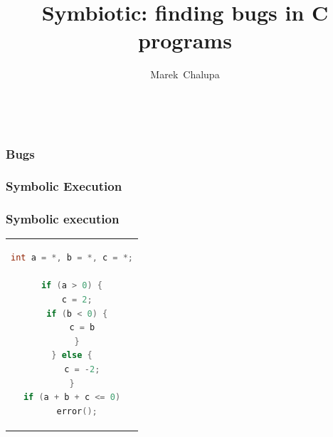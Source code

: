 \documentclass[sans]{beamer}
\title{\fontsize{0.905em}{1.5em}\selectfont Symbiotic: finding bugs in C programs}
\author{
 {Marek~Chalupa}
 }
\institute {DevConf 2019 , 25. 1. 2019}
\date{~\\[1cm]}
\begin{document}
\maketitle

\begin{frame}
\frametitle{Bugs}
\end{frame}


\begin{frame}
\frametitle{Symbolic Execution}
\end{frame}

\begin{frame}[fragile]
\frametitle{Symbolic execution}
\begin{center}
\begin{tabular}{c}
\begin{lstlisting}[language=C]
int a = *, b = *, c = *;

if (a > 0) {
  c = 2;
  if (b < 0) {
    c = b
  }
} else {
    c = -2;
}
if (a + b + c <= 0)
  error();
\end{lstlisting}
\end{tabular}
\end{center}
\end{frame}
\end{document}

